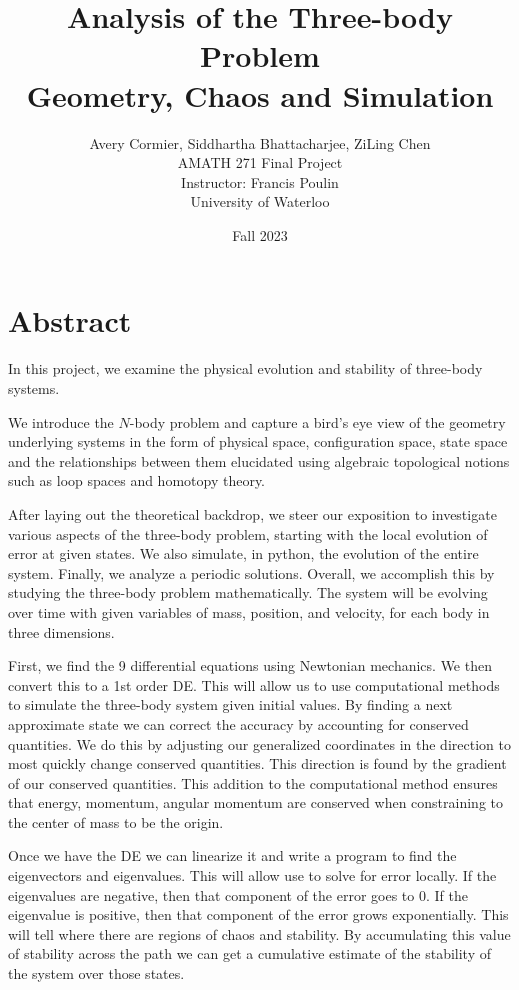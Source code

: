 \documentclass[oneside]{book}
\def\notetitle{Analysis of the Three-body Problem
}
\def\notesubtitle{Geometry, Chaos and Simulation}
\def\noteauthor{
    Avery Cormier, Siddhartha Bhattacharjee, ZiLing Chen \\
    AMATH 271 Final Project \\
    Instructor: Francis Poulin \\
    University of Waterloo
    }
\def\notedate{Fall 2023}
\begin{document}
\title{\textbf{
    \LARGE{\notetitle}} \\
    \Large{\notesubtitle} \vspace* {10\baselineskip}}
\author{\noteauthor}
\date{\notedate}

\maketitle
\newpage

\chapter*{Abstract}
In this project, we examine the physical evolution and stability of three-body systems. 

We introduce the $N$-body problem and capture a bird's eye view of the geometry underlying systems in the form of physical space, configuration space, state space and the relationships between them elucidated using algebraic topological notions such as loop spaces and homotopy theory.

After laying out the theoretical backdrop, we steer our exposition to investigate various aspects of the three-body problem, starting with the local evolution of error at given states. We also simulate, in python, the evolution of the entire system. Finally, we analyze a periodic solutions. Overall, we accomplish this by studying the three-body problem mathematically. The system will be evolving over time with given variables of mass, position, and velocity, for each body in three
dimensions. 

First, we find the 9 differential equations using Newtonian mechanics. We then convert this to a 1st order DE. This will allow us to use computational methods to simulate the three-body system given initial values. By finding a next approximate state we can correct the accuracy by accounting for conserved quantities. We do this by adjusting our generalized coordinates in the direction to most quickly change conserved quantities. This direction is
found by the gradient of our conserved quantities. This addition to the computational method ensures that energy, momentum, angular momentum are conserved when constraining to the center of mass to be the origin. 

Once we have the DE we can linearize it and write a program to find the eigenvectors and eigenvalues. This
will allow use to solve for error locally. If the eigenvalues are negative, then that component of the error goes to 0. If the eigenvalue is positive, then that component of the error grows exponentially. This will
tell where there are regions of chaos and stability. By accumulating this value of stability across the path
we can get a cumulative estimate of the stability of the system over those states.
\end{document}
